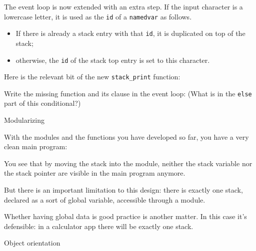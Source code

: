 The event loop is now extended with an extra step.
If the input character is a lowercase letter,
it is used as the \lstinline{id} of a \lstinline{namedvar}
as follows.
\begin{itemize}
\item If there is already a stack entry with that \lstinline{id},
  it is duplicated on top of the stack;
\item otherwise, the \lstinline{id} of the stack top entry
  is set to this character.
\end{itemize}

Here is the relevant bit of the new \lstinline{stack_print} function:
%

\begin{exercise}
  Write the missing function and its clause in the event loop:
  \def\snippetcodefraction{.7}
  \def\snippetanswfraction{.9}
  (What is in the \lstinline{else} part of this conditional?)
\end{exercise}

 {Modularizing}

With the modules and the functions you have developed so far,
you have a very clean main program:
%

You see that by moving the stack into the module,
neither the stack variable nor the stack pointer
are visible in the main program anymore.


But there is an important limitation to this design:
there is exactly one stack,
declared as a sort of global variable, accessible through a module.


Whether having global data is good practice is another matter.
In this case it's defensible: in a calculator app there will be
exactly one stack.

 {Object orientation}

